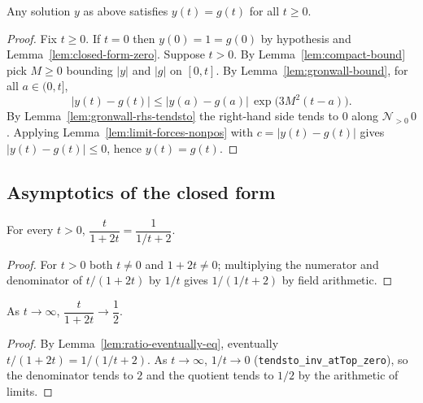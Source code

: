 \begin{lemma}[Uniqueness]
    \label{lem:uniqueness}
    \leanok
    Any solution $y$ as above satisfies $y(t) = g(t)$ for all $t \ge 0$.
\end{lemma}
\begin{proof}
    Fix $t \ge 0$. If $t = 0$ then $y(0) = 1 = g(0)$ by hypothesis and
    Lemma~\ref{lem:closed-form-zero}. Suppose $t > 0$. By
    Lemma~\ref{lem:compact-bound} pick $M \ge 0$ bounding $|y|$ and $|g|$ on
    $[0,t]$. By Lemma~\ref{lem:gronwall-bound}, for all $a \in (0,t]$,
    \[
        \bigl| y(t) - g(t) \bigr|
          \le \bigl| y(a) - g(a) \bigr|\,\exp\!\bigl(3M^2(t-a)\bigr) .
    \]
    By Lemma~\ref{lem:gronwall-rhs-tendsto} the right-hand side tends to $0$ along
    $\mathcal{N}_{>0}\,0$. Applying Lemma~\ref{lem:limit-forces-nonpos} with
    $c = |y(t)-g(t)|$ gives $|y(t) - g(t)| \le 0$, hence $y(t) = g(t)$.
\end{proof}

\subsection{Asymptotics of the closed form}

\begin{lemma}
    \label{lem:ratio-eventually-eq}
    \leanok
    For every $t > 0$, $\dfrac{t}{1+2t} = \dfrac{1}{1/t + 2}$.
\end{lemma}
\begin{proof}
    For $t > 0$ both $t \neq 0$ and $1 + 2t \neq 0$; multiplying the numerator
    and denominator of $t/(1+2t)$ by $1/t$ gives $1/(1/t + 2)$ by field
    arithmetic.
\end{proof}

\begin{lemma}
    \label{lem:ratio-limit}
    \leanok
    As $t \to \infty$, $\dfrac{t}{1 + 2t} \to \dfrac{1}{2}$.
\end{lemma}
\begin{proof}
    By Lemma~\ref{lem:ratio-eventually-eq}, eventually $t/(1+2t) = 1/(1/t+2)$.
    As $t \to \infty$, $1/t \to 0$ (\texttt{tendsto\_inv\_atTop\_zero}), so the
    denominator tends to $2$ and the quotient tends to $1/2$ by the arithmetic of
    limits.
\end{proof}

